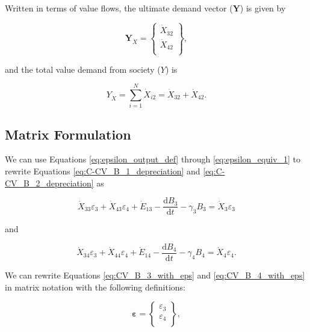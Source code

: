 \documentclass[authoryear,preprint,review,12pt]{elsarticle}
\renewcommand{\vec}[1]{\mathbf{#1}}
\begin{document}
Written in terms of value flows, the ultimate demand vector ($\vec{Y}$) is given by

\begin{equation} \label{eq:demand_vector_B_dot}
	\vec{Y}_{\dot{X}} = 	\begin{Bmatrix} 	\dot{X}_{32}	\\
																\dot{X}_{42}	\\
									\end{Bmatrix},
\end{equation}

\noindent and the total value demand from society ($Y$) is 

\begin{equation} \label{eq:total_value_demand}
	Y_{\dot{X}} = \sum_{i=1}^{N} \dot{X}_{i2} = \dot{X}_{32} + \dot{X}_{42}.
	\end{equation}


\subsection{Matrix Formulation}

We can use Equations \ref{eq:epsilon_output_def} through \ref{eq:epsilon_equiv_1} to rewrite Equations \ref{eq:C-CV_B_1_depreciation} and \ref{eq:C-CV_B_2_depreciation} as

\begin{equation} \label{eq:CV_B_3_with_eps}
	\dot{X}_{33}\varepsilon_{3} + \dot{X}_{43}\varepsilon_{4} + \dot{E}_{13} - \frac{\mathrm{d}B_{3}}{\mathrm{d}t} - \gamma_{3}B_{3} = \dot{X}_{3}\varepsilon_{3}
\end{equation}

\noindent and 

\begin{equation} \label{eq:CV_B_4_with_eps}
	\dot{X}_{34}\varepsilon_{3} + \dot{X}_{44}\varepsilon_{4} + \dot{E}_{14} - \frac{\mathrm{d}B_{4}}{\mathrm{d}t} - \gamma_{4}B_{4} = \dot{X}_{4}\varepsilon_{4}.
\end{equation}

We can rewrite Equations \ref{eq:CV_B_3_with_eps} and \ref{eq:CV_B_4_with_eps} in matrix notation with the following definitions:

\begin{equation} \label{eq:eps_vec_def}
	\vec{\varepsilon} =		\begin{Bmatrix} 	\varepsilon_{3}	\\
																\varepsilon_{4}	\\
									\end{Bmatrix},
\end{equation}
\end{document}
